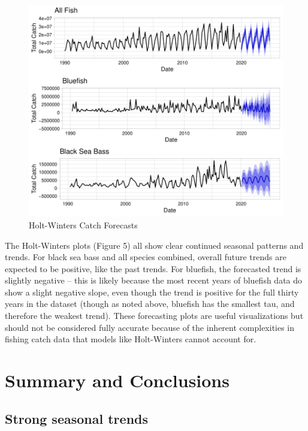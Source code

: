 \documentclass[
  12pt,
]{article}
\begin{document}
\begin{figure}[H]

\hfill{}\includegraphics{Report_FishTrends_files/figure-latex/unnamed-chunk-1-1} 

\caption{Holt-Winters Catch Forecasts}\label{fig:unnamed-chunk-1}
\end{figure}

The Holt-Winters plots (Figure 5) all show clear continued seasonal
patterns and trends. For black sea bass and all species combined,
overall future trends are expected to be positive, like the past trends.
For bluefish, the forecasted trend is slightly negative -- this is
likely because the most recent years of bluefish data do show a slight
negative slope, even though the trend is positive for the full thirty
years in the dataset (though as noted above, bluefish has the smallest
tau, and therefore the weakest trend). These forecasting plots are
useful visualizations but should not be considered fully accurate
because of the inherent complexities in fishing catch data that models
like Holt-Winters cannot account for.

\newpage

\hypertarget{summary-and-conclusions}{%
\section{Summary and Conclusions}\label{summary-and-conclusions}}

\hypertarget{strong-seasonal-trends}{%
\subsection{Strong seasonal trends}\label{strong-seasonal-trends}}
\end{document}
